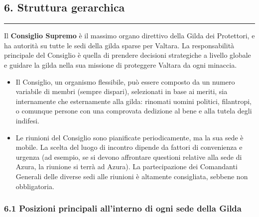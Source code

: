 \subsection{6. Struttura gerarchica}\label{struttura-gerarchica}

\begin{center}\rule{0.5\linewidth}{0.5pt}\end{center}

Il \textbf{Consiglio Supremo} è il massimo organo direttivo della Gilda
dei Protettori, e ha autorità su tutte le sedi della gilda sparse per
Valtara. La responsabilità principale del Consiglio è quella di prendere
decisioni strategiche a livello globale e guidare la gilda nella sua
missione di proteggere Valtara da ogni minaccia.

\begin{itemize}
\tightlist
\item
  Il Consiglio, un organismo flessibile, può essere composto da un
  numero variabile di membri (sempre dispari), selezionati in base ai
  meriti, sia internamente che esternamente alla gilda: rinomati uomini
  politici, filantropi, o comunque persone con una comprovata dedizione
  al bene e alla tutela degli indifesi.
\item
  Le riunioni del Consiglio sono pianificate periodicamente, ma la sua
  sede è mobile. La scelta del luogo di incontro dipende da fattori di
  convenienza e urgenza (ad esempio, se si devono affrontare questioni
  relative alla sede di Azura, la riunione si terrà ad Azura). La
  partecipazione dei Comandanti Generali delle diverse sedi alle
  riunioni è altamente consigliata, sebbene non obbligatoria.
\end{itemize}

\subsubsection{\texorpdfstring{6.1 \textbf{Posizioni principali
all'interno di ogni sede della
Gilda}}{6.1 Posizioni principali all'interno di ogni sede della Gilda}}\label{posizioni-principali-allinterno-di-ogni-sede-della-gilda}

